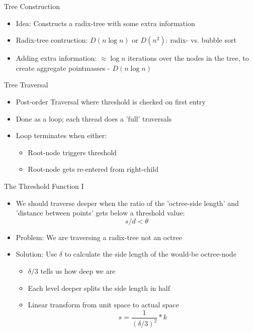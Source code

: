 \begin{frame}{Tree Construction}
\begin{itemize}
\item Idea: Constructs a radix-tree with some extra information
\item Radix-tree contruction: $D(n \log n)$ or $D(n^2)$: radix- vs. bubble sort
\item Adding extra information: $\approx \log n$ iterations over the nodes in the tree, to create aggregate pointmasses - $D(n \log n)$
\end{itemize}
\end{frame}

\begin{frame}{Tree Traversal}
\begin{itemize}
    \item Post-order Traversal where threshold is checked on first entry
    \item Done as a loop; each thread does a 'full' traversals
    \item Loop terminates when either:
      \begin{itemize}
          \item Root-node triggers threshold
          \item Root-node gets re-entered from right-child
      \end{itemize}
\end{itemize}
\end{frame}

\begin{frame}{The Threshold Function I}
\begin{itemize}
    \item We should traverse deeper when the ratio of the 'octree-side length' and 'distance between points' gets below a threshold value:
    $$s/d < \theta$$
    \item Problem: We are traversing a radix-tree not an octree
    \item Solution: Use $\delta$ to calculate the side length of the would-be octree-node
    \begin{itemize}
        \item $\delta / 3$ tells us how deep we are
        \item Each level deeper splits the side length in half
        \item Linear transform from unit space to actual space
        $$ s = \frac{1}{(\delta/3)^2} * k$$
    \end{itemize}
\end{itemize}
\end{frame}

